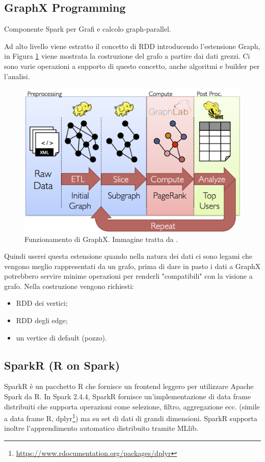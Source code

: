 \documentclass[12pt,italian]{article}
\begin{document}
\subsection{GraphX Programming}
Componente Spark per Grafi e calcolo graph-parallel.

Ad alto livello viene estratto il concetto di RDD introducendo l'estensione Graph, in Figura \ref{fig:GraphX} viene mostrata la costruzione del grafo a partire dai dati grezzi.
Ci sono varie operazioni a supporto di questo concetto, anche algoritmi e builder per l'analisi.
\begin{figure}[H]
	\centering 
	\includegraphics[width=0.8\linewidth]{img/graph_analytics_pipeline.png}
	\caption{Funzionamento di GraphX. Immagine tratta da \cite{spark}.}
	\label{fig:GraphX}
\end{figure}
Quindi userei questa estensione quando nella natura dei dati ci sono legami che vengono meglio rappresentati da un grafo,
prima di dare in pasto i dati a GraphX potrebbero servire minime operazioni per renderli "compatibili" con la visione a grafo.
Nella costruzione vengono richiesti:
\begin{itemize}
	\item RDD dei vertici;
	\item RDD degli edge;
	\item un vertice di default (pozzo).
\end{itemize}
\subsection{SparkR (R on Spark)}
SparkR è un pacchetto R che fornisce un frontend leggero per utilizzare Apache Spark da R. In Spark 2.4.4, SparkR fornisce un'implementazione di data frame distribuiti che supporta operazioni come selezione, filtro, aggregazione ecc. (simile a data frame R, dplyr\footnote{\url{https://www.rdocumentation.org/packages/dplyr}}) ma su set di dati di grandi dimensioni. SparkR supporta inoltre l'apprendimento automatico distribuito tramite MLlib.
\end{document}
